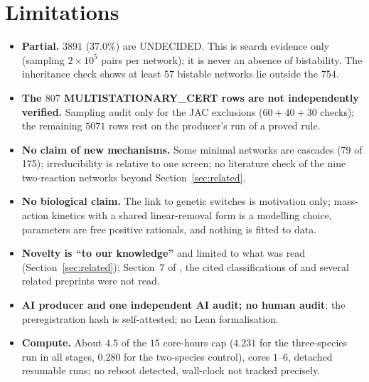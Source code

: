 \documentclass[11pt]{article}
\begin{document}
\section{Limitations}\label{sec:lim}
\begin{itemize}\itemsep=1pt
\item \textbf{Partial.} $3891$ ($37.0\%$) are UNDECIDED. This is search evidence only (sampling $2\times10^5$ pairs per network); it is never an absence of bistability. The inheritance check shows at least $57$ bistable networks lie outside the $754$.
\item \textbf{The $807$ MULTISTATIONARY\_CERT rows are not independently verified.} Sampling audit only for the JAC exclusions ($60+40+30$ checks); the remaining $5071$ rows rest on the producer's run of a proved rule.
\item \textbf{No claim of new mechanisms.} Some minimal networks are cascades (79 of 175); irreducibility is relative to one screen; no literature check of the nine two-reaction networks beyond Section~\ref{sec:related}.
\item \textbf{No biological claim.} The link to genetic switches is motivation only; mass-action kinetics with a shared linear-removal form is a modelling choice, parameters are free positive rationals, and nothing is fitted to data.
\item \textbf{Novelty is ``to our knowledge''} and limited to what was read (Section~\ref{sec:related}); Section~7 of \cite{atoms}, the cited classifications of \cite{cf05,cf06,js12} and several related preprints were not read.
\item \textbf{AI producer and one independent AI audit; no human audit}; the preregistration hash is self-attested; no Lean formalisation.
\item \textbf{Compute.} About $4.5$ of the $15$ core-hours cap ($4.231$ for the three-species run in all stages, $0.280$ for the two-species control), cores $1$--$6$, detached resumable runs; no reboot detected, wall-clock not tracked precisely.
\end{itemize}

\end{document}
